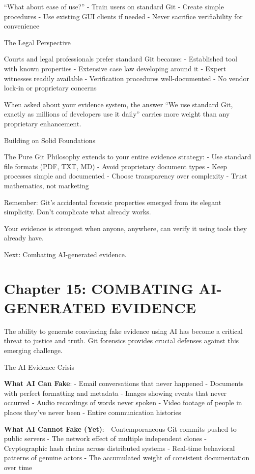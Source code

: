 ``What about ease of use?'' - Train users on standard Git - Create
simple procedures - Use existing GUI clients if needed - Never sacrifice
verifiability for convenience

The Legal Perspective

Courts and legal professionals prefer standard Git because: -
Established tool with known properties - Extensive case law developing
around it - Expert witnesses readily available - Verification procedures
well-documented - No vendor lock-in or proprietary concerns

When asked about your evidence system, the answer ``We use standard Git,
exactly as millions of developers use it daily'' carries more weight
than any proprietary enhancement.

Building on Solid Foundations

The Pure Git Philosophy extends to your entire evidence strategy: - Use
standard file formats (PDF, TXT, MD) - Avoid proprietary document types
- Keep processes simple and documented - Choose transparency over
complexity - Trust mathematics, not marketing

Remember: Git's accidental forensic properties emerged from its elegant
simplicity. Don't complicate what already works.

Your evidence is strongest when anyone, anywhere, can verify it using
tools they already have.

Next: Combating AI-generated evidence.

\section{Chapter 15: COMBATING AI-GENERATED
EVIDENCE}\label{chapter-15-combating-ai-generated-evidence}

The ability to generate convincing fake evidence using AI has become a
critical threat to justice and truth. Git forensics provides crucial
defenses against this emerging challenge.

The AI Evidence Crisis

\textbf{What AI Can Fake}: - Email conversations that never happened -
Documents with perfect formatting and metadata - Images showing events
that never occurred - Audio recordings of words never spoken - Video
footage of people in places they've never been - Entire communication
histories

\textbf{What AI Cannot Fake (Yet)}: - Contemporaneous Git commits pushed
to public servers - The network effect of multiple independent clones -
Cryptographic hash chains across distributed systems - Real-time
behavioral patterns of genuine actors - The accumulated weight of
consistent documentation over time


